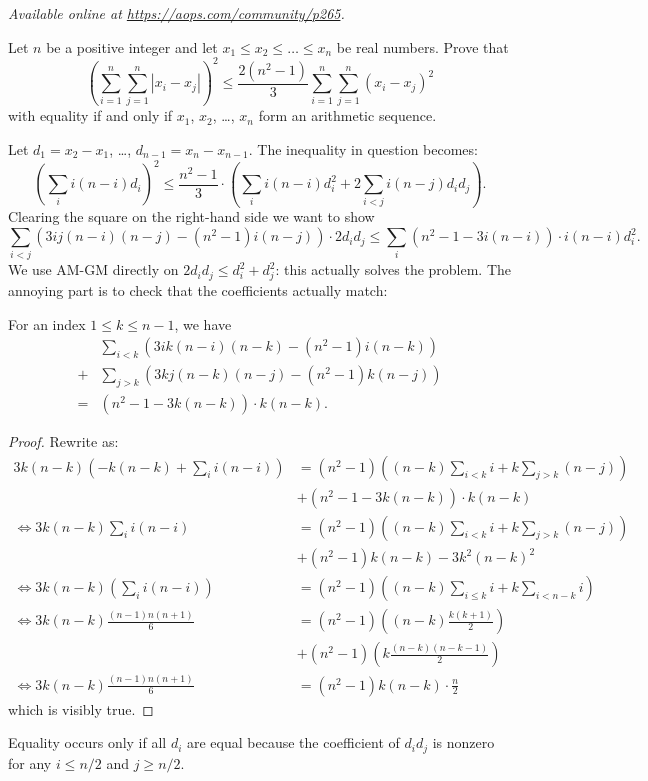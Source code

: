 \textsl{Available online at \url{https://aops.com/community/p265}.}
\begin{mdframed}[style=mdpurplebox,frametitle={Problem statement}]
Let $n$ be a positive integer and
let $x_1 \le x_2 \le \dots \le x_n$ be real numbers.
Prove that
\[ \left(\sum_{i=1}^{n}\sum_{j=1}^{n} |x_i - x_j|\right)^2
  \le \frac{2(n^2-1)}{3}\sum_{i=1}^{n}\sum_{j=1}^{n} (x_i - x_j)^2 \]
with equality if and only if $x_1$, $x_2$, \dots, $x_n$
form an arithmetic sequence.
\end{mdframed}
Let $d_1 = x_2 - x_1$, \dots, $d_{n-1} = x_n - x_{n-1}$.
The inequality in question becomes:
\[
  \left( \sum_i i(n-i) d_i \right)^2
  \le
  \frac{n^2-1}{3} \cdot
  \left( \sum_i i(n-i) d_i^2 + 2\sum_{i<j} i(n-j) d_i d_j  \right).
\]
Clearing the square on the right-hand side we want to show
\[
  \sum_{i<j} \left( 3ij(n-i)(n-j) - (n^2-1)i(n-j) \right) \cdot 2d_i d_j
  \le \sum_i (n^2-1-3i(n-i)) \cdot i(n-i) d_i^2.
\]
We use AM-GM directly on $2d_i d_j \le d_i^2 + d_j^2$:
this actually solves the problem.
The annoying part is to check that the coefficients actually match:
\begin{claim*}
  For an index $1 \le k \le n-1$, we have
  \begin{align*}
    &\sum_{i<k} \left( 3ik(n-i)(n-k) - (n^2-1)i(n-k) \right) \\
    +& \sum_{j>k} \left( 3kj(n-k)(n-j) - (n^2-1)k(n-j) \right) \\
    = & (n^2-1-3k(n-k)) \cdot k(n-k).
  \end{align*}
\end{claim*}
\begin{proof}
  Rewrite as:
  \begin{align*}
    3k(n-k) \left( -k(n-k) + \sum_i i(n-i) \right)
      &= (n^2-1)\left( (n-k)\sum_{i<k} i + k\sum_{j>k} (n-j) \right) \\
      &+ (n^2-1-3k(n-k)) \cdot k(n-k) \\
    \iff 3k(n-k) \sum_i i(n-i)
      &= (n^2-1) \left( (n-k)\sum_{i<k} i + k\sum_{j>k}(n-j) \right) \\
      &+ (n^2-1)k(n-k) - 3k^2(n-k)^2 \\
    \iff 3k(n-k) \left( \sum_{i} i(n-i) \right)
      &= (n^2-1) \left( (n-k)\sum_{i \le k} i + k \sum_{i < n-k} i \right) \\
    \iff 3k(n-k) \frac{(n-1)n(n+1)}{6}
      &= (n^2-1) \left( (n-k)\frac{k(k+1)}{2} \right) \\
      & + (n^2-1) \left( k \frac{(n-k)(n-k-1)}{2} \right) \\
    \iff 3k(n-k) \frac{(n-1)n(n+1)}{6}
      &= (n^2-1)k(n-k) \cdot \frac n2
  \end{align*}
  which is visibly true.
\end{proof}
Equality occurs only if all $d_i$ are equal
because the coefficient of $d_i d_j$ is nonzero
for any $i \le n/2$ and $j \ge n/2$.
\pagebreak